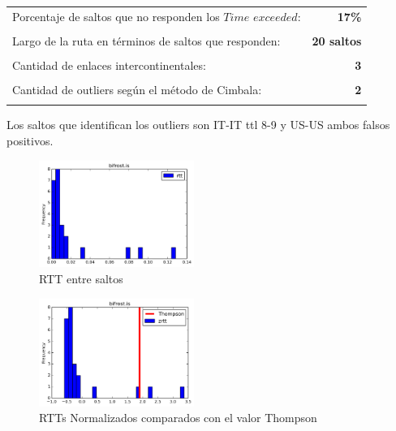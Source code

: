 \begin{center}
\begin{tabular}{p{6.5cm}r}
Porcentaje de saltos que no responden los $Time$ $exceeded$: & \textbf{17\%} \\ \\ 
Largo de la ruta en términos de saltos que responden: &\textbf{20 saltos} \\ \\
Cantidad de enlaces intercontinentales: & \textbf{3} \\ \\
Cantidad de outliers según el método de Cimbala: & \textbf{2} \\ \\
\end{tabular}
\end{center}
Los saltos que identifican los outliers son IT-IT ttl 8-9 y US-US ambos falsos positivos.
\begin{figure}[H]
  \centering
    \includegraphics[width=0.45\textwidth]{histogramas_rtt/bifrost-is.png}
  \caption{RTT entre saltos}
  \label{entropia-s}
\end{figure}

\begin{center}

\end{center}

\begin{figure}[H]
  \centering
    \includegraphics[width=0.45\textwidth]{histogramas_thompson/bifrost-is.png}
  \caption{RTTs Normalizados comparados con el valor Thompson}
  \label{entropia-s}
\end{figure}

